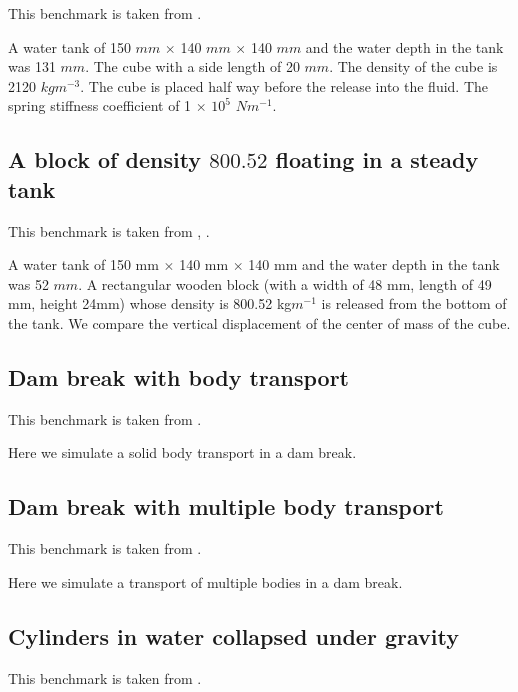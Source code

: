\documentclass[preprint,12pt]{elsarticle}
\begin{document}
This benchmark is taken from \citet{qiu20173d}.

A water tank of 150 $mm$ $\times$ 140 $mm$ $\times$ 140 $mm$ and the water
depth in the tank was 131 $mm$. The cube with a side length of 20 $mm$. The
density of the cube is 2120 $kg m^{-3}$. The cube is placed half way before
the release into the fluid. The spring stiffness coefficient of 1 $\times$
$10^{5}$ $N m^{-1}$.


\subsection{A block of density $800.52$ floating in a steady tank}
\label{sec:800-density-floating}

This benchmark is taken from \citet{qiu20173d}, \citet{wang2019numerical}.

A water tank of 150 mm $\times$ 140 mm $\times$ 140 mm and the water depth in
the tank was 52 $mm$. A rectangular wooden block (with a width of 48 mm,
length of 49 mm, height 24mm) whose density is 800.52 kg$m^{-1}$ is
released from the bottom of the tank. We compare the vertical displacement of
the center of mass of the cube.


\subsection{Dam break with body transport}
\label{sec:dam-break-with-body-transport}

This benchmark is taken from \citet{wang2019numerical}.

Here we simulate a solid body transport in a dam break.


\subsection{Dam break with multiple body transport}
\label{sec:dam-break-with-multiple-body-transport}

This benchmark is taken from \citet{wang2019numerical}.

Here we simulate a transport of multiple bodies in a dam break.


\subsection{Cylinders in water collapsed under gravity}
\label{sec:cylinders-in-water-collapsed-under-gravity}

This benchmark is taken from \citet{chen2019coupled}.
\end{document}
